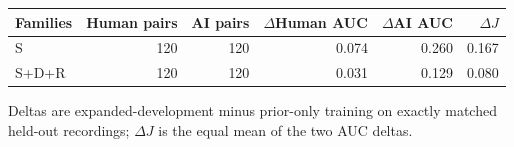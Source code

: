 \begin{tabular}{lrrrrr}
\toprule
Families & Human pairs & AI pairs & $\Delta$Human AUC & $\Delta$AI AUC & $\Delta J$ \\
\midrule
S & 120 & 120 & 0.074 & 0.260 & 0.167 \\
S+D+R & 120 & 120 & 0.031 & 0.129 & 0.080 \\
\bottomrule
\end{tabular}
\par\smallskip
{\footnotesize Deltas are expanded-development minus prior-only training on exactly matched held-out recordings; $\Delta J$ is the equal mean of the two AUC deltas.}
